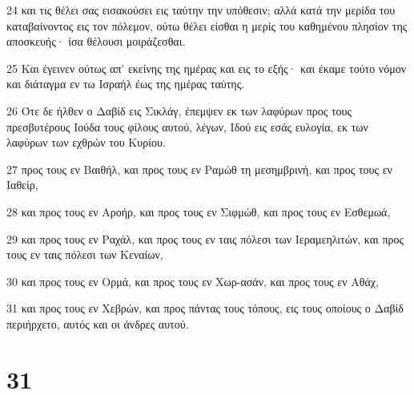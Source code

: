 \par 24 και τις θέλει σας εισακούσει εις ταύτην την υπόθεσιν; αλλά κατά την μερίδα του καταβαίνοντος εις τον πόλεμον, ούτω θέλει είσθαι η μερίς του καθημένου πλησίον της αποσκευής· ίσα θέλουσι μοιράζεσθαι.
\par 25 Και έγεινεν ούτως απ' εκείνης της ημέρας και εις το εξής· και έκαμε τούτο νόμον και διάταγμα εν τω Ισραήλ έως της ημέρας ταύτης.
\par 26 Ότε δε ήλθεν ο Δαβίδ εις Σικλάγ, έπεμψεν εκ των λαφύρων προς τους πρεσβυτέρους Ιούδα τους φίλους αυτού, λέγων, Ιδού εις εσάς ευλογία, εκ των λαφύρων των εχθρών του Κυρίου.
\par 27 προς τους εν Βαιθήλ, και προς τους εν Ραμώθ τη μεσημβρινή, και προς τους εν Ιαθείρ,
\par 28 και προς τους εν Αροήρ, και προς τους εν Σιφμώθ, και προς τους εν Εσθεμωά,
\par 29 και προς τους εν Ραχάλ, και προς τους εν ταις πόλεσι των Ιεραμεηλιτών, και προς τους εν ταις πόλεσι των Κεναίων,
\par 30 και προς τους εν Ορμά, και προς τους εν Χωρ-ασάν, και προς τους εν Αθάχ,
\par 31 και προς τους εν Χεβρών, και προς πάντας τους τόπους, εις τους οποίους ο Δαβίδ περιήρχετο, αυτός και οι άνδρες αυτού.

\chapter{31}

